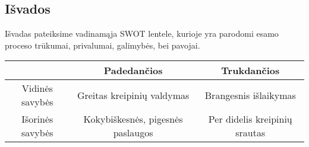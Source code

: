 		\subsection{Išvados}
			Išvadas pateiksime vadinamąja SWOT lentele, kurioje yra parodomi esamo proceso trūkumai, privalumai, galimybės, bei pavojai.	
			\begin{center}
  				\begin{tabular}{ | c | c | c | }
				\hline
    						& Padedančios & Trukdančios   \\ \hline
    				Vidinės savybės & Greitas kreipinių valdymas & Brangesnis išlaikymas \\ \hline
    				Išorinės savybės & Kokybiškesnės, pigesnės paslaugos & Per didelis kreipinių srautas \\
				\hline
  				\end{tabular}
			\end{center}	
